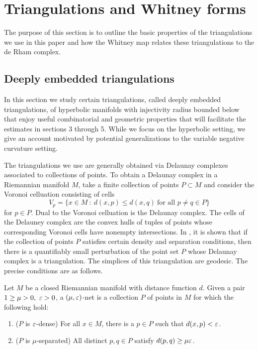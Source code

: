 \section{Triangulations and Whitney forms}
\label{sec:2}

The purpose of this section is to outline the basic properties of the triangulations we use in this paper and how the Whitney map relates these triangulations to the de Rham complex.

\subsection{Deeply embedded triangulations}

In this section we study certain triangulations, called deeply embedded triangulations, of hyperbolic manifolds with injectivity radius bounded below that enjoy useful combinatorial and geometric properties that will facilitate the estimates in sections 3 through 5. While we focus on the hyperbolic setting, we give an account motivated by potential generalizations to the variable negative curvature setting.

The triangulations we use are generally obtained via Delaunay complexes associated to collections of points. To obtain a Delaunay complex in a Riemannian manifold $M$, take a finite collection of points $P\subset M$ and consider the Voronoi celluation consisting of cells $$V_p = \{x\in M~:~ d(x,p) \leq d(x,q)~\text{for all } p \neq q \in P\}$$ for $p\in P.$ Dual to the Voronoi celluation is the Delaunay complex. The cells of the Delauney complex are the convex hulls of tuples of points whose corresponding Voronoi cells have nonempty intersections. In \cite{Bois}, it is shown that if the collection of points $P$ satisfies certain density and separation conditions, then there is a quantifiably small perturbation of the point set $P$ whose Delaunay complex is a triangulation. The simplices of this triangulation are geodesic. The precise conditions are as follows.

Let $M$ be a closed Riemannian manifold with distance function $d$. Given a pair $1\geq\mu>0,~\varepsilon>0$, a $(\mu,\varepsilon)$-net is a collection $P$ of points in $M$ for which the following hold:

\begin{enumerate}
    \item ($P$ is $\varepsilon$-dense) For all $x\in M$, there is a $p\in P$ such that $d(x,p)<\varepsilon$.

    \item ($P$ is $\mu$-separated) All distinct $p,q\in P$ satisfy $d(p,q) \geq \mu\varepsilon$.

\end{enumerate}

